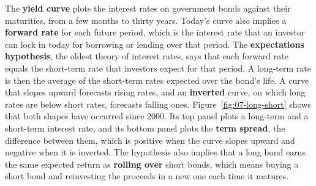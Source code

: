 The \textbf{yield curve} plots the interest rates on government bonds against their maturities, from a few months to thirty years. Today's curve also implies a \textbf{forward rate} for each future period, which is the interest rate that an investor can lock in today for borrowing or lending over that period. The \textbf{expectations hypothesis}, the oldest theory of interest rates, says that each forward rate equals the short-term rate that investors expect for that period. A long-term rate is then the average of the short-term rates expected over the bond's life. A curve that slopes upward forecasts rising rates, and an \textbf{inverted} curve, on which long rates are below short rates, forecasts falling ones. Figure~\ref{fig:07-long-short} shows that both shapes have occurred since 2000. Its top panel plots a long-term and a short-term interest rate, and its bottom panel plots the \textbf{term spread}, the difference between them, which is positive when the curve slopes upward and negative when it is inverted. The hypothesis also implies that a long bond earns the same expected return as \textbf{rolling over} short bonds, which means buying a short bond and reinvesting the proceeds in a new one each time it matures.

